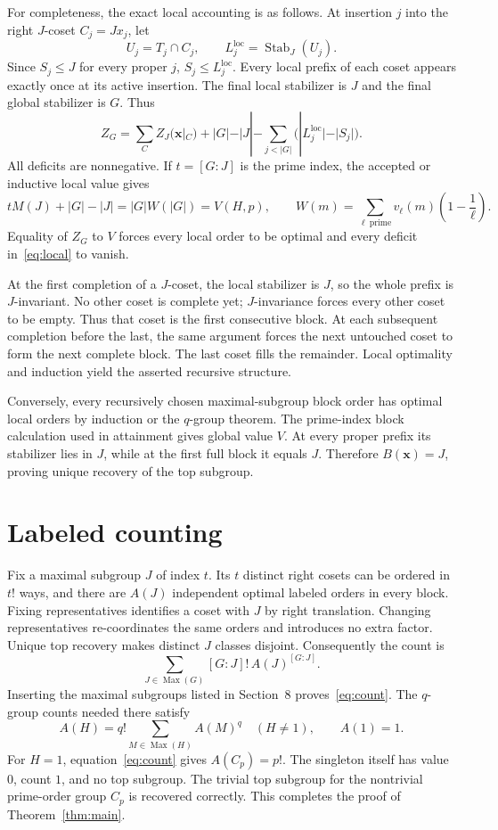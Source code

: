 \documentclass[11pt,letterpaper]{article}
\theoremstyle{definition}
\newcommand{\Stab}{\operatorname{Stab}}
\newcommand{\Max}{\operatorname{Max}}
\begin{document}
For completeness, the exact local accounting is as follows. At insertion $j$ into the right $J$-coset $C_j=Jx_j$, let
\[
U_j=T_j\cap C_j,\qquad L_j^{\mathrm{loc}}=\Stab_J(U_j).
\]
Since $S_j\le J$ for every proper $j$, $S_j\le L_j^{\mathrm{loc}}$. Every local prefix of each coset appears exactly once at its active insertion. The final local stabilizer is $J$ and the final global stabilizer is $G$. Thus
\begin{equation}
Z_G=\sum_C Z_J(\mathbf{x}|_C)+|G|-|J|
-\sum_{j<|G|}\bigl(|L_j^{\mathrm{loc}}|-|S_j|\bigr).\label{eq:local}
\end{equation}
All deficits are nonnegative. If $t=[G:J]$ is the prime index, the accepted or inductive local value gives
\begin{equation}
tM(J)+|G|-|J|=|G|W(|G|)=V(H,p),\qquad
W(m)=\sum_{\ell\ \mathrm{prime}}v_\ell(m)\left(1-\frac1\ell\right).\label{eq:inductvalue}
\end{equation}
Equality of $Z_G$ to $V$ forces every local order to be optimal and every deficit in~\eqref{eq:local} to vanish.

At the first completion of a $J$-coset, the local stabilizer is $J$, so the whole prefix is $J$-invariant. No other coset is complete yet; $J$-invariance forces every other coset to be empty. Thus that coset is the first consecutive block. At each subsequent completion before the last, the same argument forces the next untouched coset to form the next complete block. The last coset fills the remainder. Local optimality and induction yield the asserted recursive structure.

Conversely, every recursively chosen maximal-subgroup block order has optimal local orders by induction or the $q$-group theorem. The prime-index block calculation used in attainment gives global value $V$. At every proper prefix its stabilizer lies in $J$, while at the first full block it equals $J$. Therefore $B(\mathbf{x})=J$, proving unique recovery of the top subgroup.

\section{Labeled counting}
Fix a maximal subgroup $J$ of index $t$. Its $t$ distinct right cosets can be ordered in $t!$ ways, and there are $A(J)$ independent optimal labeled orders in every block. Fixing representatives identifies a coset with $J$ by right translation. Changing representatives re-coordinates the same orders and introduces no extra factor. Unique top recovery makes distinct $J$ classes disjoint. Consequently the count is
\[
\sum_{J\in\Max(G)}[G:J]!\,A(J)^{[G:J]}.
\]
Inserting the maximal subgroups listed in Section~8 proves~\eqref{eq:count}. The $q$-group counts needed there satisfy
\begin{equation}
A(H)=q!\sum_{M\in\Max(H)}A(M)^q\quad(H\ne1),\qquad A(1)=1.\label{eq:qcount}
\end{equation}
For $H=1$, equation~\eqref{eq:count} gives $A(C_p)=p!$. The singleton itself has value $0$, count $1$, and no top subgroup. The trivial top subgroup for the nontrivial prime-order group $C_p$ is recovered correctly. This completes the proof of Theorem~\ref{thm:main}.
\end{document}
